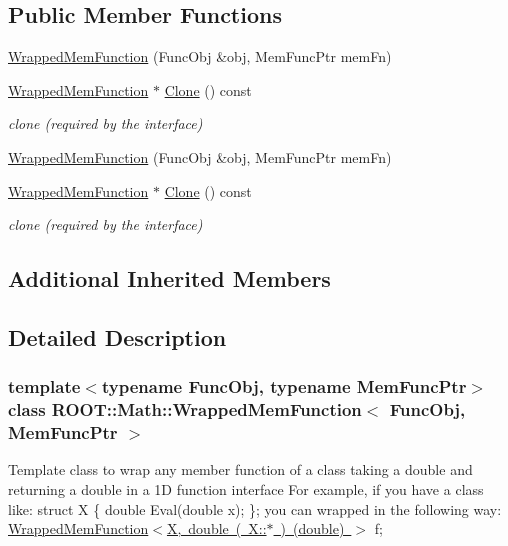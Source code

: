 \subsection*{Public Member Functions}
\begin{DoxyCompactItemize}
\item 
\mbox{\hyperlink{classROOT_1_1Math_1_1WrappedMemFunction_aae43e563f02bf4c9a2a833ff13c60234}{Wrapped\+Mem\+Function}} (Func\+Obj \&obj, Mem\+Func\+Ptr mem\+Fn)
\item 
\mbox{\hyperlink{classROOT_1_1Math_1_1WrappedMemFunction}{Wrapped\+Mem\+Function}} $\ast$ \mbox{\hyperlink{classROOT_1_1Math_1_1WrappedMemFunction_a6f27e92240e16003ff20c25df6fba1eb}{Clone}} () const
\begin{DoxyCompactList}\small\item\em clone (required by the interface) \end{DoxyCompactList}\item 
\mbox{\hyperlink{classROOT_1_1Math_1_1WrappedMemFunction_aae43e563f02bf4c9a2a833ff13c60234}{Wrapped\+Mem\+Function}} (Func\+Obj \&obj, Mem\+Func\+Ptr mem\+Fn)
\item 
\mbox{\hyperlink{classROOT_1_1Math_1_1WrappedMemFunction}{Wrapped\+Mem\+Function}} $\ast$ \mbox{\hyperlink{classROOT_1_1Math_1_1WrappedMemFunction_a6f27e92240e16003ff20c25df6fba1eb}{Clone}} () const
\begin{DoxyCompactList}\small\item\em clone (required by the interface) \end{DoxyCompactList}\end{DoxyCompactItemize}
\subsection*{Additional Inherited Members}


\subsection{Detailed Description}
\subsubsection*{template$<$typename Func\+Obj, typename Mem\+Func\+Ptr$>$\newline
class R\+O\+O\+T\+::\+Math\+::\+Wrapped\+Mem\+Function$<$ Func\+Obj, Mem\+Func\+Ptr $>$}

Template class to wrap any member function of a class taking a double and returning a double in a 1D function interface For example, if you have a class like\+: struct X \{ double Eval(double x); \}; you can wrapped in the following way\+: \mbox{\hyperlink{classROOT_1_1Math_1_1WrappedMemFunction_aae43e563f02bf4c9a2a833ff13c60234}{Wrapped\+Mem\+Function$<$\+X, double ( X\+::$\ast$ ) (double) $>$}} f; 


